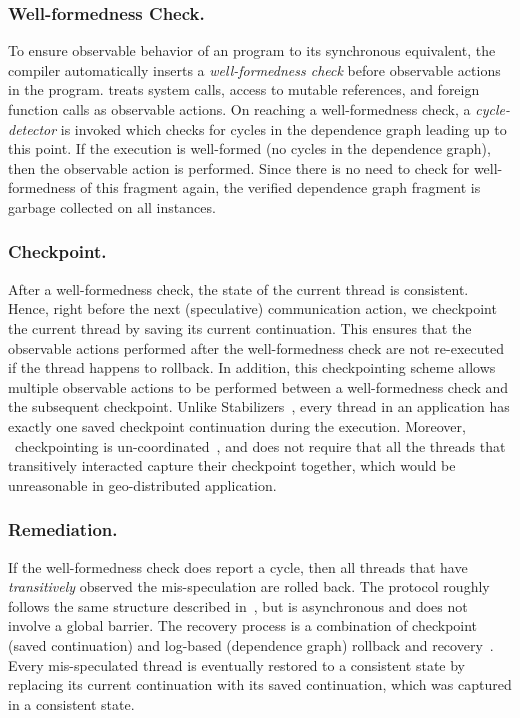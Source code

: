 \subsubsection{Well-formedness Check.} To ensure observable behavior of an
\rxcml program to its synchronous equivalent, the compiler automatically
inserts a \emph{well-formedness check} before observable actions in the
program. \rxcml treats system calls, access to mutable references, and foreign
function calls as observable actions. On reaching a well-formedness check, a
\emph{cycle-detector} is invoked which checks for cycles in the dependence
graph leading up to this point. If the execution is well-formed (no cycles in
the dependence graph), then the observable action is performed. Since there is
no need to check for well-formedness of this fragment again, the verified
dependence graph fragment is garbage collected on all instances.


\subsubsection{Checkpoint.} After a well-formedness check, the state of the
current thread is consistent. Hence, right before the next (speculative)
communication action, we checkpoint the current thread by saving its current
continuation. This ensures that the observable actions performed after the
well-formedness check are not re-executed if the thread happens to rollback. In
addition, this checkpointing scheme allows multiple observable actions to be
performed between a well-formedness check and the subsequent checkpoint. Unlike
Stabilizers~\cite{Ziarek10}, every thread in an \rxcml application has exactly
one saved checkpoint continuation during the execution. Moreover, \rxcml\
checkpointing is un-coordinated~\cite{RollbackRecovery}, and does not require
that all the threads that transitively interacted capture their checkpoint
together, which would be unreasonable in geo-distributed application.

\subsubsection{Remediation.} If the well-formedness check does report a cycle,
then all threads that have \emph{transitively} observed the mis-speculation are
rolled back. The protocol roughly follows the same structure described
in~\cite{Ziarek10}, but is asynchronous and does not involve a global barrier.
The recovery process is a combination of checkpoint (saved continuation) and
log-based (dependence graph) rollback and recovery~\cite{RollbackRecovery}.
Every mis-speculated thread is eventually restored to a consistent state by
replacing its current continuation with its saved continuation, which was
captured in a consistent state.

